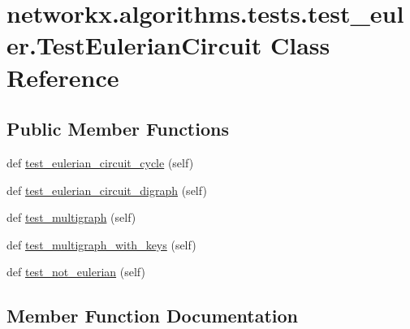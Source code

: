 \hypertarget{classnetworkx_1_1algorithms_1_1tests_1_1test__euler_1_1TestEulerianCircuit}{}\section{networkx.\+algorithms.\+tests.\+test\+\_\+euler.\+Test\+Eulerian\+Circuit Class Reference}
\label{classnetworkx_1_1algorithms_1_1tests_1_1test__euler_1_1TestEulerianCircuit}
\subsection*{Public Member Functions}
\begin{DoxyCompactItemize}
\item 
def \hyperlink{classnetworkx_1_1algorithms_1_1tests_1_1test__euler_1_1TestEulerianCircuit_a9b7c4db77fdb3de7598bb6c4e24f1d9c}{test\+\_\+eulerian\+\_\+circuit\+\_\+cycle} (self)
\item 
def \hyperlink{classnetworkx_1_1algorithms_1_1tests_1_1test__euler_1_1TestEulerianCircuit_a352e9a6b14a937407d678ca1727e25e6}{test\+\_\+eulerian\+\_\+circuit\+\_\+digraph} (self)
\item 
def \hyperlink{classnetworkx_1_1algorithms_1_1tests_1_1test__euler_1_1TestEulerianCircuit_aa15e043152d88aa351cdb8938b86e0b5}{test\+\_\+multigraph} (self)
\item 
def \hyperlink{classnetworkx_1_1algorithms_1_1tests_1_1test__euler_1_1TestEulerianCircuit_a4c27a1e4b78cf28b4f123206301011ab}{test\+\_\+multigraph\+\_\+with\+\_\+keys} (self)
\item 
def \hyperlink{classnetworkx_1_1algorithms_1_1tests_1_1test__euler_1_1TestEulerianCircuit_af0805608705c71fe2a38a217332391d8}{test\+\_\+not\+\_\+eulerian} (self)
\end{DoxyCompactItemize}


\subsection{Member Function Documentation}
\mbox{\label{classnetworkx_1_1algorithms_1_1tests_1_1test__euler_1_1TestEulerianCircuit_a9b7c4db77fdb3de7598bb6c4e24f1d9c}} 
